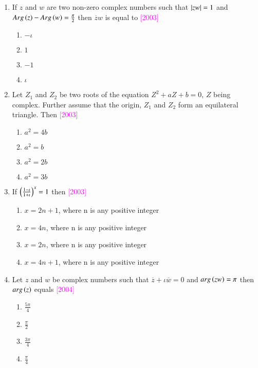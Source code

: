 \documentclass[journal,12pt,twocolumn]{IEEEtran}
\theoremstyle{remark}
\begin{document}
\begin{enumerate}
	\item{If $z$ and $w$ are two non-zero complex numbers such that $\left\vert zw\right\vert=1$ and $Arg\left(z\right) - Arg\left(w\right) = \frac{\pi}{2}$ then $\overline{z}w$ is equal to \hfill{\textcolor{magenta}{[2003]}}
		\begin{multicols}{4}
		\begin{enumerate}
			\item{$-\iota$}
			\columnbreak
			\item{$1$}
			\columnbreak
			\item{$-1$}
			\columnbreak
			\item{$\iota$}
		\end{enumerate}
		\end{multicols}}

	\item{Let $Z_1$ and $Z_2$ be two roots of the equation $Z^2 + aZ + b = 0$, $Z$ being complex. Further assume that the origin, $Z_1$ and $Z_2$ form an equilateral triangle. Then \hfill{\textcolor{magenta}{[2003]}}
		\begin{multicols}{2}
		\begin{enumerate}
			\item{$a^2 = 4b$}
			\item{$a^2 = b$}
			\columnbreak
			\item{$a^2 = 2b$}
			\item{$a^2 = 3b$}
		\end{enumerate}
		\end{multicols}}

	\item{If $\left(\frac{1-\iota}{1+\iota}\right)^x = 1$ then \hfill{\textcolor{magenta}{[2003]}}
		\begin{enumerate}
			\item{$x = 2n + 1$, where n is any positive integer}
			\item{$x = 4n$, where n is any positive integer}
			\item{$x = 2n$, where n is any positive integer}
			\item{$x = 4n + 1$, where n is any positive integer}
		\end{enumerate}}
		
	\item{Let $z$ and $w$ be complex numbers such that $\overline{z} + \iota\overline{w} = 0$ and $arg\left(zw\right) = \pi$ then $arg\left(z\right)$ equals \hfill{\textcolor{magenta}{[2004]}}
		\begin{multicols}{4}
		\begin{enumerate}
			\item{$\frac{5\pi}{4}$}
			\columnbreak 
			\item{$\frac{\pi}{2}$}
			\columnbreak
			\item{$\frac{3\pi}{4}$}
			\columnbreak
			\item{$\frac{\pi}{4}$}
		\end{enumerate}
		\end{multicols}}


\end{enumerate}
\end{document}
